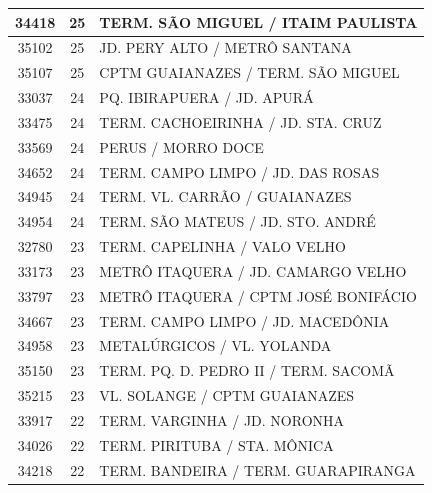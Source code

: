 \documentclass[
	12pt,				%
	oneside,			%
	a4paper,			%
	english,			%
	brazil				%
	]{abntex2ppgsi}
\begin{document}
{{\begin{apendicesenv}
\begin{longtable}{c|c|p{7cm}}
    34418 & 25    & TERM. SÃO MIGUEL / ITAIM PAULISTA \\
\hline

    35102 & 25    & JD. PERY ALTO / METRÔ SANTANA \\
\hline

    35107 & 25    & CPTM GUAIANAZES / TERM. SÃO MIGUEL \\
\hline

    33037 & 24    & PQ. IBIRAPUERA / JD. APURÁ \\
\hline

    33475 & 24    & TERM. CACHOEIRINHA / JD. STA. CRUZ \\
\hline

    33569 & 24    & PERUS / MORRO DOCE \\
\hline

    34652 & 24    & TERM. CAMPO LIMPO / JD. DAS ROSAS \\
\hline

    34945 & 24    & TERM. VL. CARRÃO / GUAIANAZES \\
\hline

    34954 & 24    & TERM. SÃO MATEUS / JD. STO. ANDRÉ \\
\hline

    32780 & 23    & TERM. CAPELINHA / VALO VELHO \\
\hline

    33173 & 23    & METRÔ ITAQUERA / JD. CAMARGO VELHO \\
\hline

    33797 & 23    & METRÔ ITAQUERA / CPTM JOSÉ BONIFÁCIO \\
\hline

    34667 & 23    & TERM. CAMPO LIMPO / JD. MACEDÔNIA \\
\hline

    34958 & 23    & METALÚRGICOS / VL. YOLANDA \\
\hline

    35150 & 23    & TERM. PQ. D. PEDRO II / TERM. SACOMÃ \\
\hline

    35215 & 23    & VL. SOLANGE / CPTM GUAIANAZES \\
\hline

    33917 & 22    & TERM. VARGINHA / JD. NORONHA \\
\hline

    34026 & 22    & TERM. PIRITUBA / STA. MÔNICA \\
\hline

    34218 & 22    & TERM. BANDEIRA / TERM. GUARAPIRANGA \\
\hline


\end{longtable}
\end{apendicesenv}}}
\end{document}
